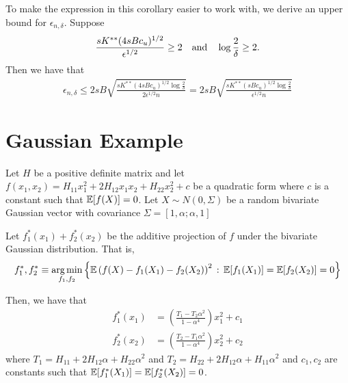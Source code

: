 To make the expression in this corollary easier to work with, we derive an upper bound for $\epsilon_{n, \delta}$. Suppose 
\begin{align}
\frac{ sK^{**} (4sBc_u)^{1/2}}{\epsilon^{1/2}} \geq 2 \quad \textrm{and} \quad \log \frac{2}{\delta} \geq 2 \label{cond:simplify_covering_number}.
\end{align}
Then we have that
\begin{align*}
\epsilon_{n,\delta} \leq 2sB \sqrt{ \frac{ sK^{**} (4 sBc_u)^{1/2} \log \frac{2}{\delta}}{2\epsilon^{1/2}n}} = 2sB \sqrt{ \frac{sK^{**} (sBc_u)^{1/2} \log \frac{2}{\delta}}{\epsilon^{1/2} n}}
\end{align*}

\section{Gaussian Example}
\label{sec:gaussian_example}

Let $H$ be a positive definite matrix and let $f(x_1, x_2) = H_{11} x_1^2 + 2H_{12} x_1x_2 + H_{22} x_2^2 + c$ be a quadratic form where $c$ is a constant such that ${\mathbb E}[f(X)] = 0$. Let $X \sim N(0, \Sigma)$ be a random bivariate Gaussian vector with covariance $\Sigma = [1, \alpha; \alpha, 1]$ 

\begin{proposition}
Let $f^*_1(x_1) + f^*_2(x_2)$ be the additive projection of $f$ under the bivariate Gaussian distribution. That is,
\begin{align*} 
f^*_1, f^*_2 \equiv \mathop{\text{\rm arg\,min}}_{f_1, f_2} \Big\{ {\mathbb E} \left(f(X) - f_1(X_1) - f_2(X_2)\right)^2 \,:\, {\mathbb E}[f_1(X_1)] = {\mathbb E}[f_2(X_2)] = 0 \Big\}
\end{align*}

Then, we have that 
\begin{align*}
f^*_1(x_1) &= \left( \frac{T_1 - T_2 \alpha^2}{1 - \alpha^4} \right) x_1^2 + c_1 \\
f^*_2(x_2) &= \left( \frac{T_2 - T_1\alpha^2}{1 - \alpha^4} \right) x_2^2 + c_2
\end{align*}
where $T_1 = H_{11} + 2H_{12} \alpha + H_{22} \alpha^2$ and $T_2 = H_{22} + 2H_{12} \alpha + H_{11} \alpha^2$ and $c_1,c_2$ are constants such that ${\mathbb E}[f_1^*(X_1)] = {\mathbb E}[f_2^*(X_2)] = 0$.
\end{proposition}

